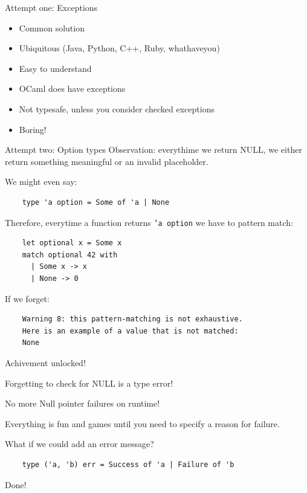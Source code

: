 \documentclass{beamer}
\begin{document}
\begin{frame}{Attempt one: Exceptions}
  \begin{itemize}
    \item Common solution
    \item Ubiquitous (Java, Python, C++, Ruby, whathaveyou)
    \item Easy to understand
    \item OCaml does have exceptions
    \pause
    \item \alert{Not typesafe}, unless you consider checked exceptions
    \item Boring!
  \end{itemize}
\end{frame}

\begin{frame}[fragile]{Attempt two: Option types}
  Observation: everythime we return NULL, we either return something
  meaningful or an invalid placeholder.

  We might even say:
  \begin{verbatim}
    type 'a option = Some of 'a | None
  \end{verbatim}

  \pause

  Therefore, everytime a function returns \texttt{'a option} we have
  to pattern match:
  \begin{verbatim}
    let optional x = Some x
    match optional 42 with
      | Some x -> x
      | None -> 0
  \end{verbatim}

  \pause

  If we forget:
  \begin{verbatim}
    Warning 8: this pattern-matching is not exhaustive.
    Here is an example of a value that is not matched:
    None
  \end{verbatim}
\end{frame}

\begin{frame}{Achivement unlocked!}
  \begin{center}
    {\Huge Forgetting to check for NULL is a type error!}
  \end{center}
  \checkmark No more Null pointer failures on runtime!
\end{frame}

\begin{frame}[fragile]
  Everything is fun and games until you need to specify a \alert{reason} for
  failure.

  What if we could add an error message?
  \begin{verbatim}
    type ('a, 'b) err = Success of 'a | Failure of 'b
  \end{verbatim}
  Done!
\end{frame}
\end{document}
